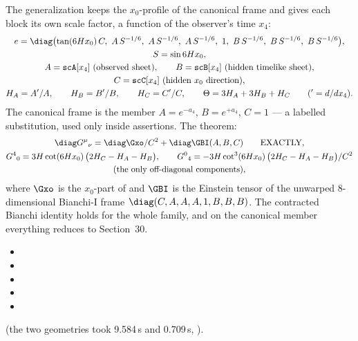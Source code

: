 The generalization keeps the $x_0$-profile of the canonical frame and gives each block its own scale
factor, a function of the observer's time $x_4$:
\begin{gather*}
  e=\diag\bigl(\tan(6Hx_0)\,C,\ A\,S^{-1/6},\ A\,S^{-1/6},\ A\,S^{-1/6},\ 1,\ B\,S^{-1/6},\ B\,S^{-1/6},\ B\,S^{-1/6}\bigr),\\
  S=\sin 6Hx_0,\\
  A=\texttt{scA}[x_4]\ \text{(observed sheet)},\qquad B=\texttt{scB}[x_4]\ \text{(hidden timelike sheet)},\\
  C=\texttt{scC}[x_4]\ \text{(hidden $x_0$ direction)},\\
  H_A=A'/A,\qquad H_B=B'/B,\qquad H_C=C'/C,\qquad \Theta=3H_A+3H_B+H_C\qquad({}'=d/dx_4).
\end{gather*}
The canonical frame is the member $A=e^{-a_4}$, $B=e^{+a_4}$, $C=1$ --- a labelled substitution, used
only inside assertions. The theorem:
\begin{gather*}
  \diag G^\mu{}_\nu=\diag\Gxo/C^2+\diag\GBI(A,B,C)\qquad\text{EXACTLY},\\
  G^4{}_0=3H\cot(6Hx_0)\,\bigl(2H_C-H_A-H_B\bigr),\qquad
  G^0{}_4=-3H\cot^3(6Hx_0)\,\bigl(2H_C-H_A-H_B\bigr)/C^2\\
  \text{(the only off-diagonal components)},
\end{gather*}
where $\Gxo$ is the $x_0$-part of  and $\GBI$ is the Einstein tensor of the unwarped
8-dimensional Bianchi-I frame $\diag(C,A,A,A,1,B,B,B)$. The contracted Bianchi identity holds for the
whole family, and on the canonical member everything reduces to Section~30. 
\begin{itemize}
  \item {}
  \item {}
  \item {}
  \item {}
  \item {}
\end{itemize}
(the two geometries took 9.584\,s and 0.709\,s, ).

